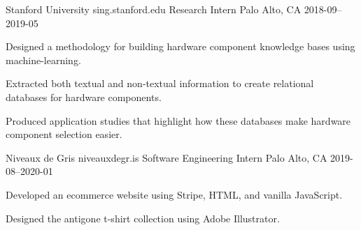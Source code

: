 \begin{cventries}
  \cventry
    {Stanford University} %
    {sing.stanford.edu} %
    {Research Intern} %
    {Palo Alto, CA} %
    {2018-09–2019-05} %
    {
      \begin{cvitems} %
        \item {Designed a methodology for building hardware component knowledge bases using machine-learning.}
        \item {Extracted both textual and non-textual information to create relational databases for hardware components.}
        \item {Produced application studies that highlight how these databases make hardware component selection easier.}
      \end{cvitems}
    }

  \cventry
    {Niveaux de Gris} %
    {niveauxdegr.is} %
    {Software Engineering Intern} %
    {Palo Alto, CA} %
    {2019-08–2020-01} %
    {
      \begin{cvitems} %
        \item {Developed an ecommerce website using Stripe, HTML, and vanilla JavaScript.}
        \item {Designed the antigone t-shirt collection using Adobe Illustrator.}
      \end{cvitems}
    }

\end{cventries}
